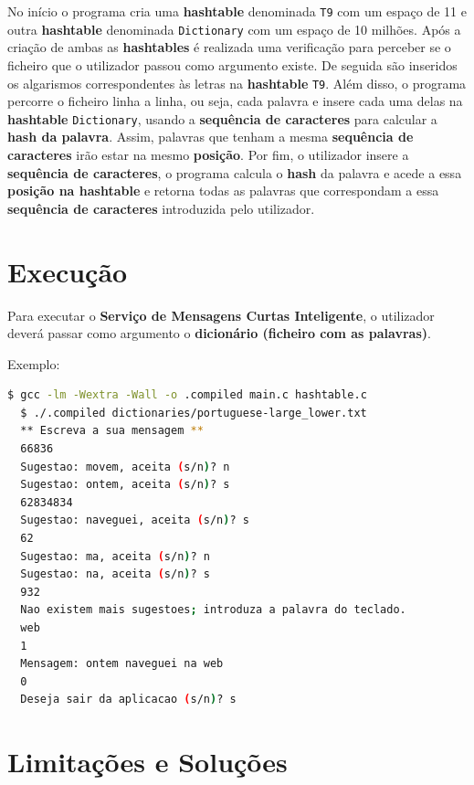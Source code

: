 \documentclass[11pt]{article}
\begin{document}
No início o programa cria uma \textbf{hashtable} denominada \verb|T9| com um espaço de 11 e outra \textbf{hashtable} denominada \verb|Dictionary| com um espaço de 10 milhões. Após a criação de ambas as \textbf{hashtables} é realizada uma verificação para perceber se o ficheiro que o utilizador passou como argumento existe. De seguida são inseridos os algarismos correspondentes às letras na \textbf{hashtable} \verb|T9|. Além disso, o programa percorre o ficheiro linha a linha, ou seja, cada palavra e insere cada uma delas na \textbf{hashtable} \verb|Dictionary|, usando a \textbf{sequência de caracteres} para calcular a \textbf{hash da palavra}. Assim, palavras que tenham a mesma \textbf{sequência de caracteres} irão estar na mesmo \textbf{posição}. Por fim, o utilizador insere a \textbf{sequência de caracteres}, o programa calcula o \textbf{hash} da palavra e acede a essa \textbf{posição na hashtable} e retorna todas as palavras que correspondam a essa \textbf{sequência de caracteres} introduzida pelo utilizador.

\section{Execução}

\hspace{0,5cm}Para executar o \textbf{Serviço de Mensagens Curtas Inteligente}, o utilizador deverá passar como argumento o \textbf{dicionário (ficheiro com as palavras)}.
\par Exemplo:
\begin{lstlisting}[language=bash]
  $ gcc -lm -Wextra -Wall -o .compiled main.c hashtable.c
  $ ./.compiled dictionaries/portuguese-large_lower.txt
  ** Escreva a sua mensagem **
  66836
  Sugestao: movem, aceita (s/n)? n
  Sugestao: ontem, aceita (s/n)? s
  62834834
  Sugestao: naveguei, aceita (s/n)? s
  62
  Sugestao: ma, aceita (s/n)? n
  Sugestao: na, aceita (s/n)? s
  932
  Nao existem mais sugestoes; introduza a palavra do teclado.
  web
  1
  Mensagem: ontem naveguei na web
  0
  Deseja sair da aplicacao (s/n)? s
\end{lstlisting}

\section{Limitações e Soluções}
\end{document}
